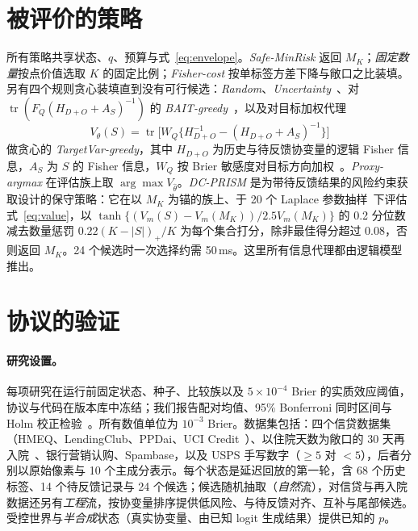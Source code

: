 \documentclass[runningheads]{llncs}
\begin{document}
\section{被评价的策略}
\label{sec:policy}
所有策略共享状态、$q$、预算与式~\eqref{eq:envelope}。\emph{Safe-MinRisk} 返回 $M_K$；\emph{固定数量}按点价值选取 $K$ 的固定比例；\emph{Fisher-cost} 按单标签方差下降与敞口之比装填。另有四个规则贪心装填直到没有可行候选：\emph{Random}、\emph{Uncertainty}~\cite{lewis1994sequential}、对 $\operatorname{tr}(F_Q(H_{D+O}+A_S)^{-1})$ 的 \emph{BAIT-greedy}~\cite{ash2021fishing}，以及对目标加权代理
\begin{equation}
 V_\theta(S)=\operatorname{tr}\big[W_Q\{H_{D+O}^{-1}-(H_{D+O}+A_S)^{-1}\}\big]\label{eq:value}
\end{equation}
做贪心的 \emph{TargetVar-greedy}，其中 $H_{D+O}$ 为历史与待反馈协变量的逻辑 Fisher 信息，$A_S$ 为 $S$ 的 Fisher 信息，$W_Q$ 按 Brier 敏感度对目标方向加权~\cite{yu2006transductive,bickfordsmith2023prediction}。\emph{Proxy-argmax} 在评估族上取 $\arg\max V_{\hat\theta}$。\emph{DC-PRISM} 是为带待反馈结果的风险约束获取设计的保守策略：它在以 $M_K$ 为锚的族上、于 20 个 Laplace 参数抽样~\cite{mackay1992practical}下评估式~\eqref{eq:value}，以 $\tanh\{(V_m(S)-V_m(M_K))/2.5V_m(M_K)\}$ 的 0.2 分位数减去数量惩罚 $0.22(K-|S|)_+/K$ 为每个集合打分，除非最佳得分超过 $0.08$，否则返回 $M_K$。24 个候选时一次选择约需 50\,ms。这里所有信息代理都由逻辑模型推出。

\section{协议的验证}
\label{sec:validation}
\paragraph{研究设置。}每项研究在运行前固定状态、种子、比较族以及 $5\times10^{-4}$ Brier 的实质效应阈值，协议与代码在版本库中冻结；我们报告配对均值、95\% Bonferroni 同时区间与 Holm 校正检验~\cite{holm1979simple}。所有数值单位为 $10^{-3}$ Brier。数据集包括：四个信贷数据集（HMEQ、LendingClub、PPDai、UCI Credit~\cite{sasHMEQ,lendingclubSource,ppdaiSource,he2018ensemble,yeh2009comparison}）、以住院天数为敞口的 30 天再入院~\cite{strack2014impact}、银行营销认购、Spambase，以及 USPS 手写数字（$\ge5$ 对 $<5$），后者分别以原始像素与 10 个主成分表示。每个状态是延迟回放的第一轮，含 68 个历史标签、14 个待反馈记录与 24 个候选；候选随机抽取（\emph{自然}流），对信贷与再入院数据还另有\emph{工程}流，按协变量排序提供低风险、与待反馈对齐、互补与尾部候选。受控世界与\emph{半合成}状态（真实协变量、由已知 logit 生成结果）提供已知的 $p$。
\end{document}
